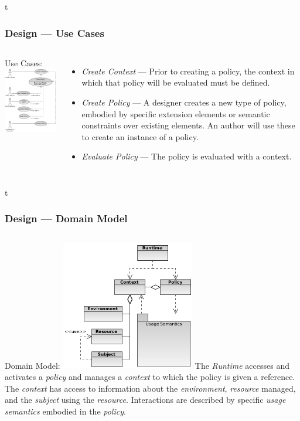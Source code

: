 \documentclass[t, xcolor=dvipsnames, 10pt]{beamer}
\begin{document}
\begin{frame}{t}
\frametitle{Design --- Use Cases}
\begin{columns}[t]
Use Cases:
\includegraphics[width=2.3in]{use-cases}
\begin{itemize}
\item<2-> \textit{Create Context} --- Prior to creating a policy, the context in which that policy will be evaluated must be defined.
\item<3-> \textit{Create Policy} --- A designer creates a new type of policy, embodied by specific extension elements or semantic constraints over existing elements.  An author will use these to create an instance of a policy.
\item<4-> \textit{Evaluate Policy} --- The policy is evaluated with a context.
\end{itemize}
\end{columns}
\end{frame}

\begin{frame}{t}
\frametitle{Design --- Domain Model}
\begin{columns}[t]
Domain Model:
\includegraphics[width=2.3in]{ontology}
\pause
The \textit{Runtime} accesses and activates a \textit{policy} and manages a \textit{context} to which the policy is given a reference.
\newline
\newline
\pause
The \textit{context} has access to information about the \textit{environment}, \textit{resource} managed, and the \textit{subject} using the \textit{resource}. 
\newline
\newline
\pause
Interactions are described by specific \textit{usage semantics} embodied in the \textit{policy}.
\end{columns}
\end{frame}
\end{document}
